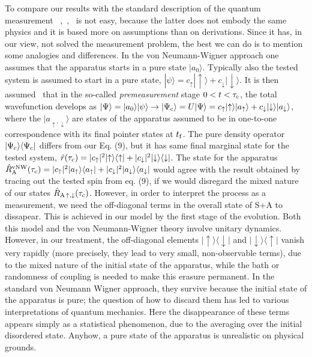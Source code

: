 \documentclass[12pt, onecolumn, aps,prb,floatfix]{revtex4-2}
\newcommand{\tauc}{{\tau_{\rm c}}}
\newcommand{\RA}{{\rm A}}
\newcommand{\down}{{\downarrow}}
\newcommand{\up}{{\uparrow}}
\newcommand{\tf}{t_{\rm f}}
\begin{document}
To compare our results with the standard description of the quantum measurement
~\cite{wh},~\cite{deMuynck},~\cite{Schlosshauer}
is not easy, because the latter does not embody the same physics and 
it is based more on assumptions than on derivations. 
Since it has, in our view, not solved the measurement problem,
the best we can do is to mention some analogies and differences.
In the von Neumann-Wigner approach one assumes that the apparatus starts 
in a pure state $|a_0\rangle$. 
Typically also the tested system is assumed to start in a pure state, 
$|\psi\rangle=c_\up|\up\rangle+c_\down|\down\rangle$. 
It is then assumed~\cite{deMuynck} that in the so-called {\it premeasurement} stage
$0<t<\tauc$, 
the total wavefunction develops as $|\Psi\rangle=|a_0\rangle|\psi\rangle\to 
|\Psi_{\rm c}\rangle=U|\Psi\rangle
=c_\up|\up\rangle|a_\up\rangle+c_\down|\down\rangle |a_\down\rangle$, where
the $|a_{\up,\down}\rangle$ are states of the apparatus assumed to be in 
one-to-one correspondence with its final pointer states at $\tf$.
The pure density operator $|\Psi_{\rm c}\rangle\langle\Psi_{\rm c}|$ differs
from our Eq. (9), but it has same final marginal state for the tested system, 
$\hat r(\tauc)=|c_\up|^2|\up\rangle\langle \up|+|c_\down|^2|\down\rangle\langle\down|$. 
The state for the apparatus 
$\hat R_\RA^{\rm vNW}(\tauc)=%
|c_\up|^2|a_\up\rangle\langle a_\up|
+|c_\down|^2|a_\down\rangle\langle a_\down|$
would agree with the result obtained by tracing out the tested spin from eq. (9), 
if we would disregard the mixed nature of our states 
$\hat R_{\RA\,\up,\down}(\tauc)$. 
However, in order to interpret the process as a measurement, we need the off-diagonal terms 
in the overall state of S+A to dissapear. This is achieved in our model by the first stage of
 the evolution. Both this model and the 
von Neumann-Wigner theory involve unitary dynamics. However, in our treatment,
the off-diagonal elements $|\up\rangle\langle \down|$ 
and $|\down\rangle\langle \up|$  vanish very rapidly (more precisely, they lead to very 
small, non-observable terms), due to the mixed nature of the initial state of the apparatus,
while the bath or randomness of coupling is needed to make this erasure permanent. 
In the standard von Neumann Wigner approach, they survive because the initial state of the
 apparatus is pure; 
the question of how to discard  them has led to various interpretations of quantum mechanics. 
Here the disappearance of these terms appears simply as a statistical phenomenon, due to the 
averaging over the initial disordered state. Anyhow, a pure state of the apparatus is 
unrealistic on physical grounds.  
\end{document}
